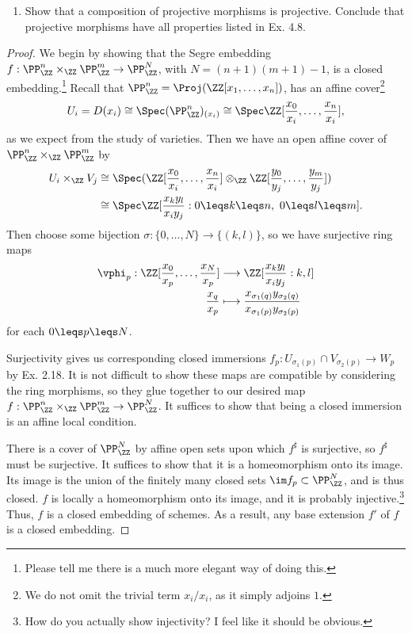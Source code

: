 \documentclass[12pt]{amsart}
\begin{document}
\begin{enumerate}
  \item[4.9.] {
      Show that a composition of projective morphisms is projective.
      Conclude that projective morphisms have all properties listed in Ex. 4.8.
    }
\end{enumerate}

\begin{proof}
  We begin by showing that the Segre embedding $f: \PP_\ZZ^n\times_\ZZ\PP_\ZZ^m\to \PP_\ZZ^{N}$, with $N=(n+1)(m+1)-1$, is a closed embedding.\footnote{Please tell me there is a much more elegant way of doing this.}
  Recall that $\PP_\ZZ^n=\Proj (\ZZ[x_1,\ldots, x_n])$, has an affine cover\footnote{We do not omit the trivial term $x_i/x_i$, as it simply adjoins $1$.}
  \[
    U_i=D(x_i)\cong \Spec (\PP_\ZZ^n)_{(x_i)}\cong \Spec \ZZ[\frac{x_0}{x_i},\ldots, \frac{x_n}{x_i}],
  \]
  as we expect from the study of varieties.
  Then we have an open affine cover of $\PP_\ZZ^n\times_\ZZ\PP_\ZZ^m$ by
  \begin{align*}
    U_i\times_\ZZ V_j 
    &\cong \Spec (\ZZ[\frac{x_0}{x_i},\ldots, \frac{x_n}{x_i}]
    \otimes_\ZZ \ZZ[\frac{y_0}{y_j},\ldots, \frac{y_m}{y_j}]) \\
    &\cong \Spec \ZZ[\frac{x_ky_l}{x_iy_j}: 0\leqs k\leqs n, ~ 0\leqs l\leqs m].
  \end{align*}
  Then choose some bijection $\sigma:\{0,\ldots, N\}\to \{(k,l)\}$, so we have surjective ring maps 
  \begin{align*}
    \vphi_p: \ZZ[\frac{x_0}{x_p},\ldots, \frac{x_N}{x_p}] &\longrightarrow
    \ZZ[\frac{x_ky_l}{x_iy_j}: k,l] \\
    \frac{x_q}{x_p}&\longmapsto \frac{x_{\sigma_1(q)}y_{\sigma_2(q)}}{x_{\sigma_1(p)}y_{\sigma_2(p)}}
  \end{align*}
  for each $0\leqs p\leqs N$.

  Surjectivity gives us corresponding closed immersions $f_{p}:U_{\sigma_1(p)}\cap V_{\sigma_2(p)}\to W_p$ by Ex. 2.18.
  It is not difficult to show these maps are compatible by considering the ring morphisms, so they glue together to our desired map $f: \PP_\ZZ^n \times_\ZZ \PP_\ZZ^m \to \PP_\ZZ^N$.
  It suffices to show that being a closed immersion is an affine local condition.

  There is a cover of $\PP_\ZZ^N$ by affine open sets upon which $f^\sharp$ is surjective, so $f^\sharp$ must be surjective.
  It suffices to show that it is a homeomorphism onto its image.
  Its image is the union of the finitely many closed sets $\im f_p\subset \PP_\ZZ^N$, and is thus closed.
  $f$ is locally a homeomorphism onto its image, and it is probably injective.\footnote{How do you actually show injectivity? I feel like it should be obvious.} %
  Thus, $f$ is a closed embedding of schemes.
  As a result, any base extension $f'$ of $f$ is a closed embedding.


\end{proof}
\end{document}
